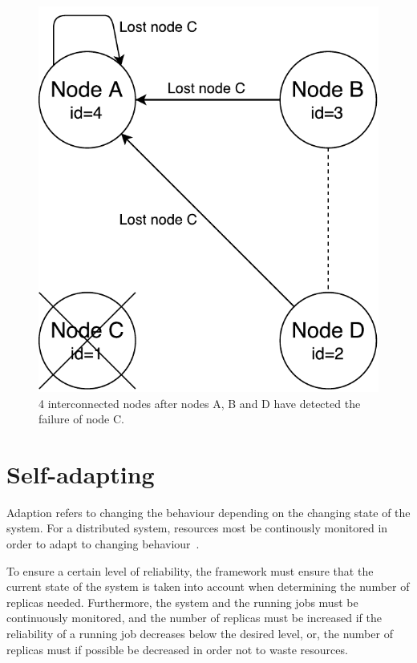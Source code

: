 \documentclass{cslthse-msc}
\begin{document}
\begin{figure}[!hbt]
\centering
\includegraphics[scale=0.5]{images/handling_node_failure.pdf}
\caption{4 interconnected nodes after nodes A, B and D have detected the failure of node C.}\label{fig:handling_node_failure}
\end{figure}

\section{Self-adapting} \label{sec:design_self_adapting}
Adaption refers to changing the behaviour depending on the changing state of the system. For a distributed system, resources most be continously monitored in order to adapt to changing behaviour~\cite{imprRelAdaptRL}.

To ensure a certain level of reliability, the framework must ensure that the current state of the system is taken into account when determining the number of replicas needed. Furthermore, the system and the running jobs must be continuously monitored, and the number of replicas must be increased if the reliability of a running job decreases below the desired level, or, the number of replicas must if possible be decreased in order not to waste resources.
\end{document}
